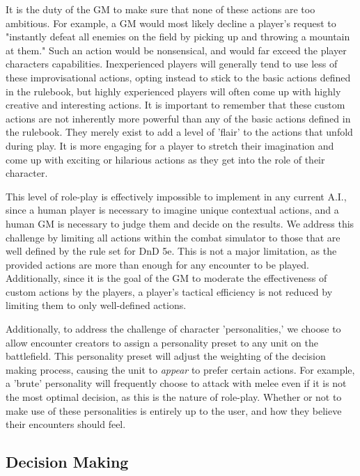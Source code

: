 \documentclass[12pt,a4paper]{report}
\begin{document}
		It is the duty of the GM to make sure that none of these actions are too ambitious. For example, a GM would most likely decline a player's request to "instantly defeat all enemies on the field by picking up and throwing a mountain at them." Such an action would be nonsensical, and would far exceed the player characters capabilities. Inexperienced players will generally tend to use less of these improvisational actions, opting instead to stick to the basic actions defined in the rulebook, but highly experienced players will often come up with highly creative and interesting actions. It is important to remember that these custom actions are not inherently more powerful than any of the basic actions defined in the rulebook. They merely exist to add a level of 'flair' to the actions that unfold during play. It is more engaging for a player to stretch their imagination and come up with exciting or hilarious actions as they get into the role of their character. 
		
		 This level of role-play is effectively impossible to implement in any current A.I., since a human player is necessary to imagine unique contextual actions, and a human GM is necessary to judge them and decide on the results. We address this challenge by limiting all actions within the combat simulator to those that are well defined by the rule set for DnD 5e. This is not a major limitation, as the provided actions are more than enough for any encounter to be played. Additionally, since it is the goal of the GM to moderate the effectiveness of custom actions by the players, a player's tactical efficiency is not reduced by limiting them to only well-defined actions. 

		Additionally, to address the challenge of character 'personalities,' we choose to allow encounter creators to assign a personality preset to any unit on the battlefield. This personality preset will adjust the weighting of the decision making process, causing the unit to \textit{appear} to prefer certain actions. For example, a 'brute' personality will frequently choose to attack with melee even if it is not the most optimal decision, as this is the nature of role-play. Whether or not to make use of these personalities is entirely up to the user, and how they believe their encounters should feel. 
		
		\subsection{Decision Making}
		
\end{document}
